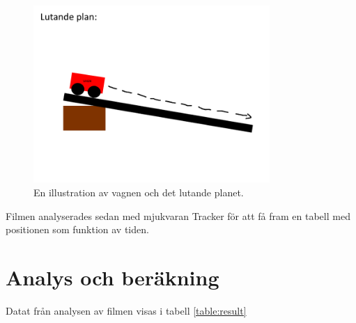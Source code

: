 \documentclass[11p, titlepage, oneside, a4paper]{article}
\begin{document}
        \begin{figure}[!h]
            \includegraphics[width=0.8\textwidth]{images/lutande plan.png}
            \caption{En illustration av vagnen och det lutande planet.}
            \label{fig:lutandeplan}
        \end{figure}
        
        Filmen analyserades sedan med mjukvaran Tracker för att få fram en tabell med positionen som funktion av tiden.
    \newpage
	\section{Analys och beräkning}
        Datat från analysen av filmen visas i tabell \ref{table:result}
\end{document}
